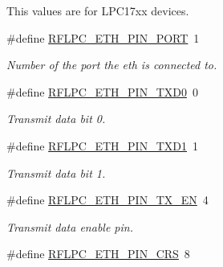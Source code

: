 This values are for L\-P\-C17xx devices. \begin{DoxyCompactItemize}
\item 
\hypertarget{group__eth_gae223711fb13e9928de624ffb989c2be6}{\#define \hyperlink{group__eth_gae223711fb13e9928de624ffb989c2be6}{R\-F\-L\-P\-C\-\_\-\-E\-T\-H\-\_\-\-P\-I\-N\-\_\-\-P\-O\-R\-T}~1}\label{group__eth_gae223711fb13e9928de624ffb989c2be6}

\begin{DoxyCompactList}\small\item\em Number of the port the eth is connected to. \end{DoxyCompactList}\item 
\hypertarget{group__eth_ga64e2830bb571bd868d1a0f7dc691b40c}{\#define \hyperlink{group__eth_ga64e2830bb571bd868d1a0f7dc691b40c}{R\-F\-L\-P\-C\-\_\-\-E\-T\-H\-\_\-\-P\-I\-N\-\_\-\-T\-X\-D0}~0}\label{group__eth_ga64e2830bb571bd868d1a0f7dc691b40c}

\begin{DoxyCompactList}\small\item\em Transmit data bit 0. \end{DoxyCompactList}\item 
\hypertarget{group__eth_gad50aab764ed158ad2b0188bc1238135e}{\#define \hyperlink{group__eth_gad50aab764ed158ad2b0188bc1238135e}{R\-F\-L\-P\-C\-\_\-\-E\-T\-H\-\_\-\-P\-I\-N\-\_\-\-T\-X\-D1}~1}\label{group__eth_gad50aab764ed158ad2b0188bc1238135e}

\begin{DoxyCompactList}\small\item\em Transmit data bit 1. \end{DoxyCompactList}\item 
\hypertarget{group__eth_gaf0f07384e3ef0fbcf2394df3b345d94c}{\#define \hyperlink{group__eth_gaf0f07384e3ef0fbcf2394df3b345d94c}{R\-F\-L\-P\-C\-\_\-\-E\-T\-H\-\_\-\-P\-I\-N\-\_\-\-T\-X\-\_\-\-E\-N}~4}\label{group__eth_gaf0f07384e3ef0fbcf2394df3b345d94c}

\begin{DoxyCompactList}\small\item\em Transmit data enable pin. \end{DoxyCompactList}\item 
\hypertarget{group__eth_ga2de28d2d47d0388182cc0bccb4074be5}{\#define \hyperlink{group__eth_ga2de28d2d47d0388182cc0bccb4074be5}{R\-F\-L\-P\-C\-\_\-\-E\-T\-H\-\_\-\-P\-I\-N\-\_\-\-C\-R\-S}~8}\label{group__eth_ga2de28d2d47d0388182cc0bccb4074be5}


\end{DoxyCompactItemize}
